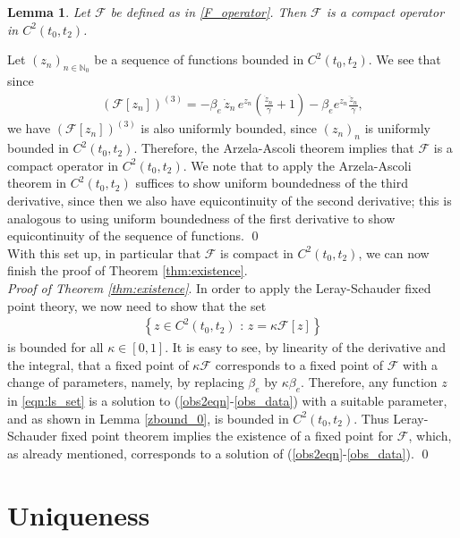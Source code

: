 \documentclass{article}
\newtheorem{lem}[thm]{Lemma}
\newcommand{\obs}{(\ref{obs2eqn}-\ref{obs_data})}
\newcommand{\obss}{(\ref{obs2eqn}-\ref{obs_data}) }
\newcommand{\be}{\beta_e}
\newcommand{\F}{\mathcal{F}}
\begin{document}
\begin{lem} \label{compactness}
    Let $\F$ be defined as in \eqref{F_operator}. Then $\F$ is a compact operator in $C^2(t_0,t_2)$. 
\end{lem}

\proof Let $(z_n)_{n \in \mathbb{N}_0}$ be a sequence of functions bounded in $C^2(t_0,t_2)$. We see that since
%
\begin{align*}
    (\F[z_n])^{(3)}=- \be \, \dot{z}_n \, e^{z_n}\left(\frac{\dot{z}_n}{\gamma} + 1\right) - \be e^{z_n} \frac{\ddot{z}_n}{\gamma}, %
\end{align*}
%
we have $(\F[z_n])^{(3)}$ is also uniformly bounded, since $(z_n)_n$ is uniformly bounded in $C^2(t_0,t_2)$. Therefore, the Arzela-Ascoli theorem implies that $\F$ is a compact operator in $C^2(t_0,t_2)$. We note that to apply the Arzela-Ascoli theorem in $C^2(t_0,t_2)$ suffices to show uniform boundedness of the third derivative, since then we also have equicontinuity of the second derivative; this is analogous to using uniform boundedness of the first derivative to show equicontinuity of the sequence of functions. \qed \\

With this set up, in particular that $\F$ is compact in $C^2(t_0,t_2)$, we can now finish the proof of Theorem \ref{thm:existence}. \\

\noindent \textit{Proof of Theorem \ref{thm:existence}}. In order to apply the Leray-Schauder fixed point theory, we now need to show that the set
%
\begin{align}
    \left\{ z \in C^2(t_0,t_2) \text{ : } z = \kappa \F[z] \right\} \label{eqn:ls_set}
\end{align}
%
is bounded for all $\kappa \in[0,1]$. It is easy to see, by linearity of the derivative and the integral, that a fixed point of $\kappa \F$ corresponds to a fixed point of $\F$ with a change of parameters, namely, by replacing $\be$ by $\kappa \be$. Therefore, any function $z$ in \eqref{eqn:ls_set} is a solution to \obss with a suitable parameter, and as shown in Lemma \ref{zbound_0}, is bounded in $C^2(t_0,t_2)$. Thus Leray-Schauder fixed point theorem implies the existence of a fixed point for $\F$, which, as already mentioned, corresponds to a solution of \obs. \qed

\section{Uniqueness} 
\label{uniqueness}
\end{document}
